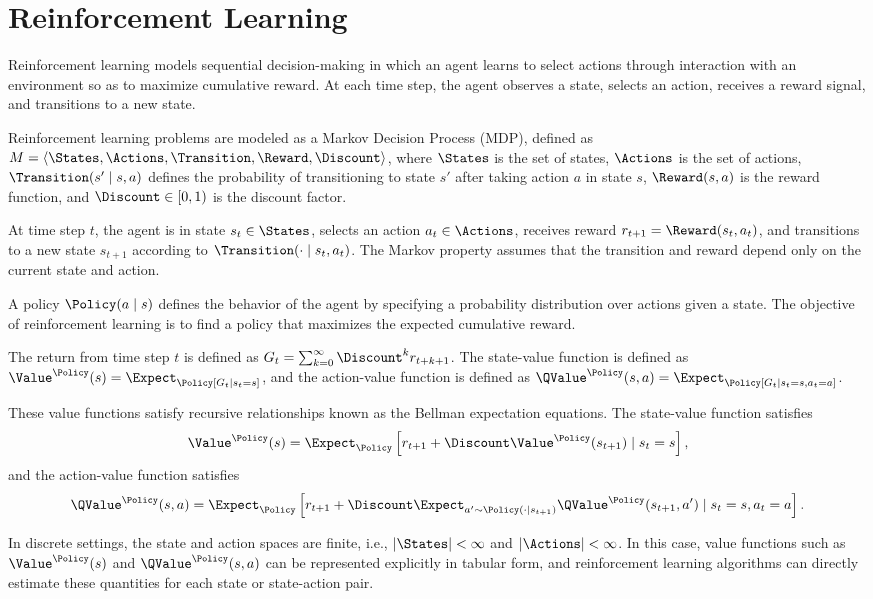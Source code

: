 \section{Reinforcement Learning}
\label{sec:rl}

Reinforcement learning models sequential decision-making in which an agent learns to select actions through interaction with an environment so as to maximize cumulative reward. At each time step, the agent observes a state, selects an action, receives a reward signal, and transitions to a new state.

Reinforcement learning problems are modeled as a Markov Decision Process (MDP), defined as $M = \langle \States, \Actions, \Transition, \Reward, \Discount \rangle$, where $\States$ is the set of states, $\Actions$ is the set of actions, $\Transition(s' \mid s,a)$ defines the probability of transitioning to state $s'$ after taking action $a$ in state $s$, $\Reward(s,a)$ is the reward function, and $\Discount \in [0,1)$ is the discount factor.

At time step $t$, the agent is in state $s_t \in \States$, selects an action $a_t \in \Actions$, receives reward $r_{t+1} = \Reward(s_t,a_t)$, and transitions to a new state $s_{t+1}$ according to $\Transition(\cdot \mid s_t,a_t)$. The Markov property assumes that the transition and reward depend only on the current state and action.

A policy $\Policy(a \mid s)$ defines the behavior of the agent by specifying a probability distribution over actions given a state. The objective of reinforcement learning is to find a policy that maximizes the expected cumulative reward.

The return from time step $t$ is defined as $G_t = \sum_{k=0}^{\infty} \Discount^k r_{t+k+1}$. The state-value function is defined as $\Value^\Policy(s) = \Expect_\Policy [G_t \mid s_t = s]$, and the action-value function is defined as $\QValue^\Policy(s,a) = \Expect_\Policy [G_t \mid s_t = s, a_t = a]$.

These value functions satisfy recursive relationships known as the Bellman expectation equations. The state-value function satisfies
\[
\Value^\Policy(s) = \Expect_\Policy \left[ r_{t+1} + \Discount \Value^\Policy(s_{t+1}) \mid s_t = s \right],
\]
and the action-value function satisfies
\[
\QValue^\Policy(s,a) = \Expect_\Policy \left[ r_{t+1} + \Discount \Expect_{a' \sim \Policy(\cdot \mid s_{t+1})} \QValue^\Policy(s_{t+1}, a') \mid s_t = s, a_t = a \right].
\]

In discrete settings, the state and action spaces are finite, i.e., $|\States| < \infty$ and $|\Actions| < \infty$. In this case, value functions such as $\Value^\Policy(s)$ and $\QValue^\Policy(s,a)$ can be represented explicitly in tabular form, and reinforcement learning algorithms can directly estimate these quantities for each state or state-action pair.

